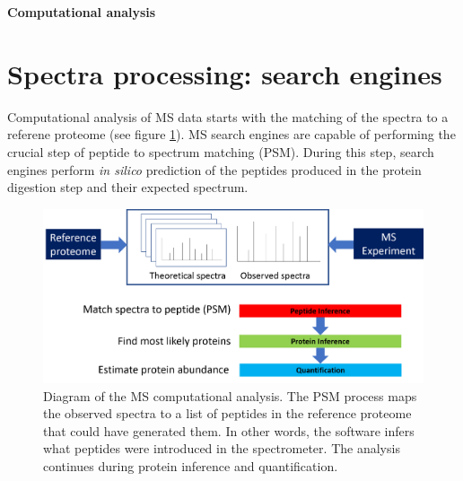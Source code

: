 \documentclass[11pt, a4paper]{report}
\begin{document}
%
%
 
 
\LARGE
\textbf{Computational analysis}
\normalsize

\section{Spectra processing: search engines}
\label{sec:search_engines}

Computational analysis of MS data starts with the matching of the spectra to a referene proteome (see figure \ref{fig:computational_analysis}). \ac{MS} search engines are capable of performing the crucial step of peptide to spectrum matching (PSM). During this step, search engines perform \textit{in silico} prediction of the peptides produced in the protein digestion step and their expected spectrum.


\begin{figure}[!h]
\includegraphics[width=\textwidth]{computational_analysis}
\caption{Diagram of the MS computational analysis. The PSM process maps the observed spectra to a list of peptides in the reference proteome that could have generated them. In other words, the software infers what peptides were introduced in the spectrometer. The analysis continues during protein inference and quantification.}
\label{fig:computational_analysis}
\end{figure}
\end{document}
